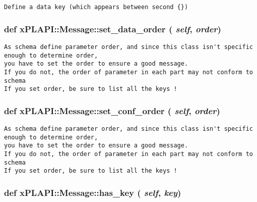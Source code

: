 \footnotesize\begin{verbatim}
Define a data key (which appears between second {})
\end{verbatim}
\normalsize
 \hypertarget{classxPLAPI_1_1Message_254a763505a2ddb64ecd8d1b96f984d6}{
\subsubsection[set\_\-data\_\-order]{\setlength{\rightskip}{0pt plus 5cm}def xPLAPI::Message::set\_\-data\_\-order ( {\em self}, \/   {\em order})}}
\label{classxPLAPI_1_1Message_254a763505a2ddb64ecd8d1b96f984d6}




\footnotesize\begin{verbatim}
As schema define parameter order, and since this class isn't specific enough to determine order,
you have to set the order to ensure a good message.
If you do not, the order of parameter in each part may not conform to schema
If you set order, be sure to list all the keys !
\end{verbatim}
\normalsize
 \hypertarget{classxPLAPI_1_1Message_191e86e1dccd20aa0ea63158429e6d68}{
\subsubsection[set\_\-conf\_\-order]{\setlength{\rightskip}{0pt plus 5cm}def xPLAPI::Message::set\_\-conf\_\-order ( {\em self}, \/   {\em order})}}
\label{classxPLAPI_1_1Message_191e86e1dccd20aa0ea63158429e6d68}




\footnotesize\begin{verbatim}
As schema define parameter order, and since this class isn't specific enough to determine order,
you have to set the order to ensure a good message.
If you do not, the order of parameter in each part may not conform to schema
If you set order, be sure to list all the keys !
\end{verbatim}
\normalsize
 \hypertarget{classxPLAPI_1_1Message_e8bde03ac8436238c97cad324897c2ee}{
\subsubsection[has\_\-key]{\setlength{\rightskip}{0pt plus 5cm}def xPLAPI::Message::has\_\-key ( {\em self}, \/   {\em key})}}
\label{classxPLAPI_1_1Message_e8bde03ac8436238c97cad324897c2ee}




